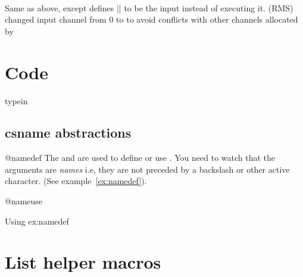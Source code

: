  
 \DescribeMacro
  \typein{}\\
  Same as above, except defines |\CS| to be the input
                      instead of executing it.
  {(RMS) changed input channel from 0 to  to avoid
     conflicts with other channels allocated by }

\section{Code}

\begin{macro}{typein}{}

\begin{teX}
\def\typein{%
  \let\@typein\relax
  \@testopt\@xtypein\@typein}
\end{teX}

\begin{teX}
\def\@xtypein[#1]#2{%
  \typeout{#2}%
  \advance\endlinechar\@M
  \read\@inputcheck to#1%
  \advance\endlinechar-\@M
  \@typein}
\end{teX}
\end{macro}

\subsection{csname abstractions }

\begin{docCommand}{@namedef}{}
The  and  are used to define or use . You need to watch
that the arguments are \emph{names} i.e, they are not preceded by a backslash or other active character.
(See example~\ref{ex:namedef}).

\end{docCommand}
\begin{docCommand}{@nameuse}{}
\end{docCommand}

\begin{teX}
\def\@namedef#1{\expandafter\def\csname #1\endcsname}
\def\@nameuse#1{\csname #1\endcsname}
\end{teX}


\begin{texexample}{Using \string\@namedef}{ex:namedef}
\makeatletter
{}
\makeatother
\end{texexample}

\section{List helper macros}

